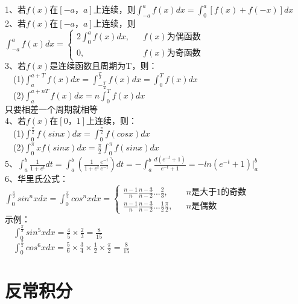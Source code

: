 \documentclass{article}
\begin{document}
\begin{flushleft}
	1、若$f(x)$在$[-a，a]$上连续，则$\int_{-a}^{a}f(x)dx=\int_{0}^{a}[f(x)+f(-x)]dx$\\
	2、若$f(x)$在$[-a，a]$上连续，则$\int_{-a}^{a}f(x)dx=\left\{
	\begin{array}{rcl}
	2\int_{0}^{a}f(x)dx,& & f(x)\mbox{为偶函数}\\
	0,& & f(x)\mbox{为奇函数}
	\end{array} \right.$\\
	3、若$f(x)$是连续函数且周期为T，则：\\
	\ \ (1)$\int_{a}^{a+T}f(x)dx=\int_{-\frac{T}{2}}^{\frac{T}{2}}f(x)dx=\int_{0}^{T}f(x)dx$\\
	\ \ (2)$\int_{a}^{a+nT}f(x)dx=n\int_{0}^{T}f(x)dx$\\
	只要相差一个周期就相等\\
	4、若$f(x)$在$[0，1]$上连续，则：\\
	\ \ (1)$\int_{0}^{\frac{\pi}{2}}f(sinx)dx=\int_{0}^{\frac{\pi}{2}}f(cosx)dx$\\
	\ \ (2)$\int_{0}^{\pi}xf(sinx)dx=\frac{\pi}{2}\int_{0}^{\pi}f(sinx)dx$\\
	5、$\int_{a}^{b}\frac{1}{1+e^t}dt=\int_{a}^{b}(\frac{1}{1+e^t}\frac{e^{-t}}{e^{-t}})dt=-\int_{a}^{b}\frac{d(e^{-t}+1)}{e^{-t}+1}=-ln(e^{-t}+1)|_a^b$\\
	6、华里氏公式：$\int_{0}^{\frac{\pi}{2}}sin^nxdx=\int_{0}^{\frac{\pi}{2}}cos^nxdx=\left\{
	\begin{array}{rcl}
	\frac{n-1}{n}\frac{n-3}{n-2}...\frac{2}{3},& & n\mbox{是大于1的奇数}\\
	\frac{n-1}{n}\frac{n-3}{n-2}...\frac{1}{2}\frac{\pi}{2},& & n\mbox{是偶数}
	\end{array} \right.$\\
	示例：\\
	\ \ $\int_{0}^{\frac{\pi}{2}}sin^5xdx=\frac{4}{5}\times\frac{2}{3}=\frac{8}{15}$\\
	\ \ $\int_{0}^{\frac{\pi}{2}}cos^6xdx=\frac{5}{6}\times\frac{3}{4}\times\frac{1}{2}\times\frac{\pi}{2}=\frac{8}{15}$\\
	
	\section{反常积分}
	

\end{flushleft}
\end{document}

